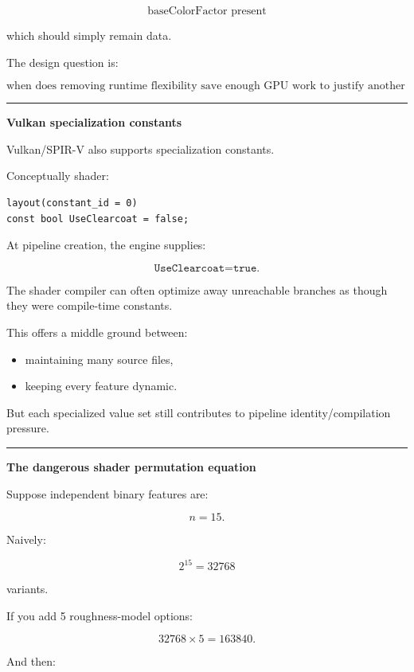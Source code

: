 \[
\text{baseColorFactor present}
\]

which should simply remain data.

The design question is:

\[
\boxed{
\text{when does removing runtime flexibility save enough GPU work to justify another compiled variant?}
}
\]

\begin{center}\rule{0.5\linewidth}{0.5pt}\end{center}

\textbf{Vulkan specialization constants}

Vulkan/SPIR-V also supports specialization constants.

Conceptually shader:

\begin{verbatim}
layout(constant_id = 0)
const bool UseClearcoat = false;
\end{verbatim}

At pipeline creation, the engine supplies:

\[
\texttt{UseClearcoat=true}.
\]

The shader compiler can often optimize away unreachable branches as though they were compile-time constants.

This offers a middle ground between:

\begin{itemize}
\tightlist
\item
  maintaining many source files,
\item
  keeping every feature dynamic.
\end{itemize}

But each specialized value set still contributes to pipeline identity/compilation pressure.

\begin{center}\rule{0.5\linewidth}{0.5pt}\end{center}

\textbf{The dangerous shader permutation equation}

Suppose independent binary features are:

\[
n=15.
\]

Naively:

\[
2^{15}
=
32768
\]

variants.

If you add 5 roughness-model options:

\[
32768\times5
=
163840.
\]

And then:

